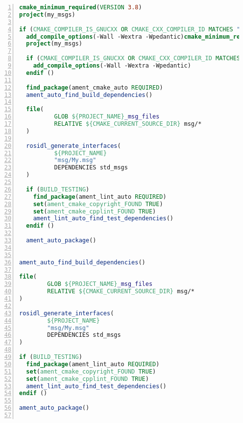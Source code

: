 \begin{lstlisting}[language=cmake,label=lst:cmake_2,caption=my\_msgs.cpp,numbers=left]
    cmake_minimum_required(VERSION 3.8)
project(my_msgs)

if (CMAKE_COMPILER_IS_GNUCXX OR CMAKE_CXX_COMPILER_ID MATCHES "Clang")
  add_compile_options(-Wall -Wextra -Wpedantic)cmake_minimum_required(VERSION 3.8)
  project(my_msgs)
  
  if (CMAKE_COMPILER_IS_GNUCXX OR CMAKE_CXX_COMPILER_ID MATCHES "Clang")
    add_compile_options(-Wall -Wextra -Wpedantic)
  endif ()
  
  find_package(ament_cmake_auto REQUIRED)
  ament_auto_find_build_dependencies()
  
  file(
          GLOB ${PROJECT_NAME}_msg_files
          RELATIVE ${CMAKE_CURRENT_SOURCE_DIR} msg/*
  )
  
  rosidl_generate_interfaces(
          ${PROJECT_NAME}
          "msg/My.msg"
          DEPENDENCIES std_msgs
  )
  
  if (BUILD_TESTING)
    find_package(ament_lint_auto REQUIRED)
    set(ament_cmake_copyright_FOUND TRUE)
    set(ament_cmake_cpplint_FOUND TRUE)
    ament_lint_auto_find_test_dependencies()
  endif ()
  
  ament_auto_package()
  
  
ament_auto_find_build_dependencies()

file(
        GLOB ${PROJECT_NAME}_msg_files
        RELATIVE ${CMAKE_CURRENT_SOURCE_DIR} msg/*
)

rosidl_generate_interfaces(
        ${PROJECT_NAME}
        "msg/My.msg"
        DEPENDENCIES std_msgs
)

if (BUILD_TESTING)
  find_package(ament_lint_auto REQUIRED)
  set(ament_cmake_copyright_FOUND TRUE)
  set(ament_cmake_cpplint_FOUND TRUE)
  ament_lint_auto_find_test_dependencies()
endif ()

ament_auto_package()


\end{lstlisting}

